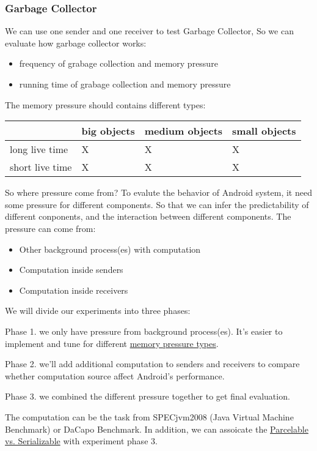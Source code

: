 \documentclass[11pt]{article}
\begin{document}
\subsubsection{Garbage Collector}
\label{sec-3-2-1}
We can use one sender and one receiver to test Garbage Collector,
So we can evaluate how garbage collector works:
\begin{itemize}
\item frequency of grabage collection and memory pressure
\item running time of grabage collection and memory pressure
\end{itemize}

The memory pressure should contains different \label{Memory-Pressure-Types}types:
\begin{center}
\begin{tabular}{l|lll}
 & big objects & medium objects & small objects\\
\hline
long live time & X & X & X\\
short live time & X & X & X\\
\end{tabular}
\end{center}

So where pressure come from?
To evalute the behavior of Android system, it need some pressure for
different components. So that we can infer the predictability of different
conponents, and the interaction between different components.
The pressure can come from:

\begin{itemize}
\item Other background process(es) with computation
\item Computation inside senders
\item Computation inside receivers
\end{itemize}

We will divide our experiments into three phases:

Phase 1. we only have pressure from background process(es).
It's easier to implement and tune for different \hyperref[Memory-Pressure-Types]{memory pressure types}.

Phase 2. we'll add additional computation to senders and receivers to compare
whether computation source affect Android's performance.

Phase 3. we combined the different pressure together to get final evaluation.

The computation can be the task from SPECjvm2008 (Java Virtual Machine Benchmark) or DaCapo Benchmark.
In addition, we can assoicate the \hyperref[Parcelable/Serializable]{Parcelable vs. Serializable} with experiment phase 3.
\end{document}
